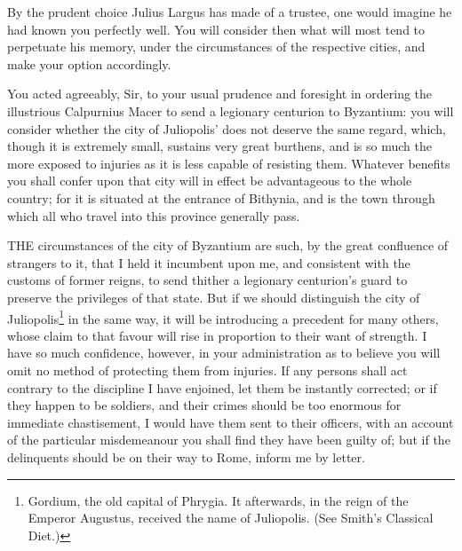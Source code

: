 
By the prudent choice Julius Largus has made of a trustee, one would
imagine he had known you perfectly well. You will consider then what will
most tend to perpetuate his memory, under the circumstances of the
respective cities, and make your option accordingly.


You acted agreeably, Sir, to your usual prudence and foresight in ordering
the illustrious Calpurnius Macer to send a legionary centurion to
Byzantium: you will consider whether the city of Juliopolis' does not
deserve the same regard, which, though it is extremely small, sustains
very great burthens, and is so much the more exposed to injuries as it is
less capable of resisting them. Whatever benefits you shall confer upon
that city will in effect be advantageous to the whole country; for it is
situated at the entrance of Bithynia, and is the town through which all
who travel into this province generally pass.


THE circumstances of the city of Byzantium are such, by the great
confluence of strangers to it, that I held it incumbent upon me, and
consistent with the customs of former reigns, to send thither a legionary
centurion's guard to preserve the privileges of that state. But if we
should distinguish the city of Juliopolis\footnote{Gordium, the old
capital of Phrygia. It afterwards, in the reign of the Emperor Augustus,
received the name of Juliopolis. (See Smith's Classical Diet.)} in the same way,
it will be introducing a precedent for many others, whose claim to that
favour will rise in proportion to their want of strength. I have so much
confidence, however, in your administration as to believe you will omit no
method of protecting them from injuries. If any persons shall act contrary
to the discipline I have enjoined, let them be instantly corrected; or if
they happen to be soldiers, and their crimes should be too enormous for
immediate chastisement, I would have them sent to their officers, with an
account of the particular misdemeanour you shall find they have been
guilty of; but if the delinquents should be on their way to Rome, inform
me by letter.


